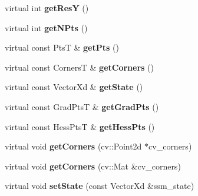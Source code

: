 \begin{DoxyCompactItemize}
\item 
\hypertarget{classStateSpaceModel_aaea8e70981e9171f84ca45fc9a0cf6c1}{virtual int {\bfseries get\-Res\-Y} ()}\label{classStateSpaceModel_aaea8e70981e9171f84ca45fc9a0cf6c1}

\item 
\hypertarget{classStateSpaceModel_a27bb8ee1cb8f5883eedda9210d6cac73}{virtual int {\bfseries get\-N\-Pts} ()}\label{classStateSpaceModel_a27bb8ee1cb8f5883eedda9210d6cac73}

\item 
\hypertarget{classStateSpaceModel_ad8acc900a157f2e0085ca0a2e4eb5d8f}{virtual const Pts\-T \& {\bfseries get\-Pts} ()}\label{classStateSpaceModel_ad8acc900a157f2e0085ca0a2e4eb5d8f}

\item 
\hypertarget{classStateSpaceModel_ac337b4e350ee3b35a55a6e717af10504}{virtual const Corners\-T \& {\bfseries get\-Corners} ()}\label{classStateSpaceModel_ac337b4e350ee3b35a55a6e717af10504}

\item 
\hypertarget{classStateSpaceModel_ae2494bbafef9a94228bd092899f0f22b}{virtual const Vector\-Xd \& {\bfseries get\-State} ()}\label{classStateSpaceModel_ae2494bbafef9a94228bd092899f0f22b}

\item 
\hypertarget{classStateSpaceModel_ae8255e1c441159eb090aca872bb83d70}{virtual const Grad\-Pts\-T \& {\bfseries get\-Grad\-Pts} ()}\label{classStateSpaceModel_ae8255e1c441159eb090aca872bb83d70}

\item 
\hypertarget{classStateSpaceModel_a2c5061bfc6441e01164c50343616feea}{virtual const Hess\-Pts\-T \& {\bfseries get\-Hess\-Pts} ()}\label{classStateSpaceModel_a2c5061bfc6441e01164c50343616feea}

\item 
\hypertarget{classStateSpaceModel_a288778a0c735f8759362cece4a31a2a7}{virtual void {\bfseries get\-Corners} (cv\-::\-Point2d $\ast$cv\-\_\-corners)}\label{classStateSpaceModel_a288778a0c735f8759362cece4a31a2a7}

\item 
\hypertarget{classStateSpaceModel_a9db874f66ba2ff130719a80ba8348ade}{virtual void {\bfseries get\-Corners} (cv\-::\-Mat \&cv\-\_\-corners)}\label{classStateSpaceModel_a9db874f66ba2ff130719a80ba8348ade}

\item 
\hypertarget{classStateSpaceModel_ae7e89511cd71018a38cf78c52e6d1c56}{virtual void {\bfseries set\-State} (const Vector\-Xd \&ssm\-\_\-state)}\label{classStateSpaceModel_ae7e89511cd71018a38cf78c52e6d1c56}


\end{DoxyCompactItemize}
